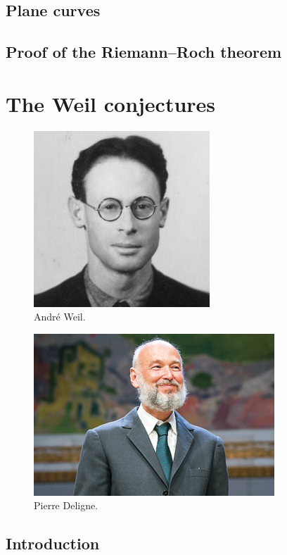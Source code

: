 \documentclass [11 pt, oneside, margin = 1 in] {article}
\begin{document}
\subsection{Plane curves}
\subsection{Proof of the Riemann--Roch theorem}


\section{The Weil conjectures}

\begin{figure}
	\begin{center}
		\includegraphics[scale=0.8]{images/weil}
		\caption{Andr\'e Weil.}
	\end{center}
\end{figure}

\begin{figure}
	\begin{center}
		\includegraphics[scale=0.8]{images/deligne}
		\caption{Pierre Deligne.}
	\end{center}
\end{figure}

\subsection{Introduction}
\end{document}
